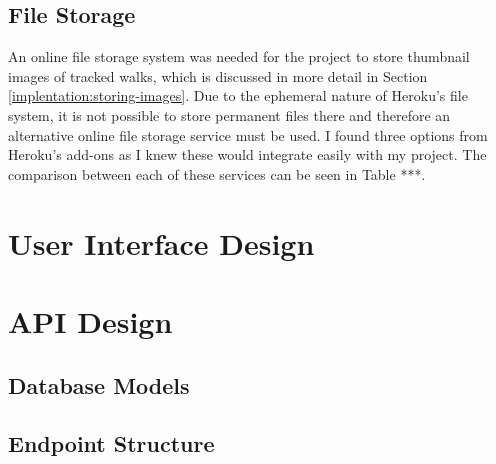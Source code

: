 
\subsection{File Storage}


An online file storage system was needed for the project to store thumbnail images of tracked walks, which is discussed in more detail in Section \ref{implentation:storing-images}. Due to the ephemeral nature of Heroku's file system, it is not possible to store permanent files there and therefore an alternative online file storage service must be used. I found three options from Heroku's add-ons as I knew these would integrate easily with my project. The comparison between each of these services can be seen in Table ***.

\section{User Interface Design}



\section{API Design}


\subsection{Database Models}


\subsection{Endpoint Structure}